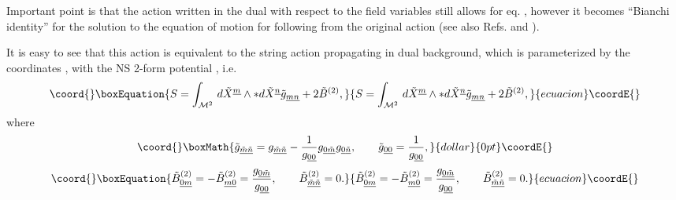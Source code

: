 \documentclass[a4paper,11pt]{article}
\begin{document}
Important point is that the action  written in the dual with respect to
the \coordHE{} field variables \coordHE{} still allows for eq. ,
however it becomes ``Bianchi identity'' for the solution to the equation 
of motion for \coordHE{} following from the original action \cite{hklr} 
(see also Refs. \cite{duff} and \cite{hl}).

It is easy to see that this action is equivalent to the string action
propagating in dual background, which is parameterized by the coordinates
\coordHE{}, with the NS 2-form potential \coordHE{}, i.e.
\begin{equation}\coord{}\boxEquation{\plabel{A2D}
S=\int_{{\cal M}^2}\, d{\tilde X}^{\underline m}\wedge \ast
d{\tilde X}^{\underline n}{\tilde g}_{\underline{mn}}+2{\tilde B}^{(2)},
}{S=\int_{{\cal M}^2}\, d{\tilde X}^{\underline m}\wedge \ast
d{\tilde X}^{\underline n}{\tilde g}_{\underline{mn}}+2{\tilde B}^{(2)},
}{ecuacion}\coordE{}\end{equation}
where \cite{buscher}
$$\coord{}\boxMath{
{\tilde g}_{\underline{\tilde m}\underline{\tilde n}}=
g_{\underline{\tilde m}\underline{\tilde n}}-{1\over g_{\underline{00}}}
g_{\underline{0}\underline{\tilde m}}g_{\underline{0}\underline{\tilde
n}},\qquad {\tilde g}_{\underline{00}}={1\over g_{\underline{00}}},
}{dollar}{0pt}\coordE{}$$
\begin{equation}\coord{}\boxEquation{\plabel{TR}
{\tilde B}^{(2)}_{\underline{0}\underline{m}}=
-{\tilde B}^{(2)}_{\underline{m}\underline{0}}=
{g_{\underline{0}\underline{\tilde m}}\over g_{\underline{00}}}, \qquad
{\tilde B}^{(2)}_{\underline{\tilde m}\underline{\tilde n}}=0.
}{{\tilde B}^{(2)}_{\underline{0}\underline{m}}=
-{\tilde B}^{(2)}_{\underline{m}\underline{0}}=
{g_{\underline{0}\underline{\tilde m}}\over g_{\underline{00}}}, \qquad
{\tilde B}^{(2)}_{\underline{\tilde m}\underline{\tilde n}}=0.
}{ecuacion}\coordE{}\end{equation}
\end{document}
